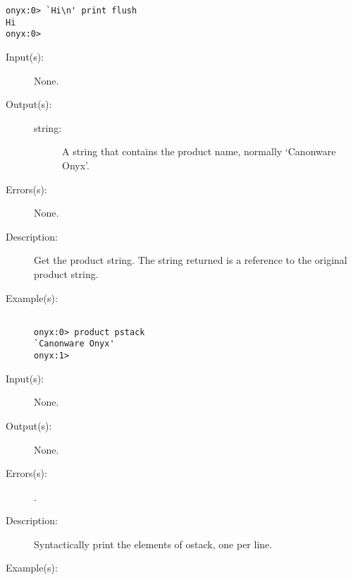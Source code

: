 \begin{description}
\begin{description}
\begin{verbatim}
onyx:0> `Hi\n' print flush
Hi
onyx:0>
		\end{verbatim}
	\end{description}
\label{systemdict:product}
\item[{\onyxop{--}{product}{string}}: ]
	\begin{description}\item[]
	\item[Input(s): ] None.
	\item[Output(s): ]
		\begin{description}\item[]
		\item[string: ]
			A string that contains the product name, normally
			`Canonware Onyx'.
		\end{description}
	\item[Errors(s): ] None.
	\item[Description: ]
		Get the product string.  The string returned is a reference to
		the original product string.
	\item[Example(s): ]\begin{verbatim}

onyx:0> product pstack
`Canonware Onyx'
onyx:1>
		\end{verbatim}
	\end{description}
\label{systemdict:pstack}
\item[{\onyxop{--}{pstack}{--}}: ]
	\begin{description}\item[]
	\item[Input(s): ] None.
	\item[Output(s): ] None.
	\item[Errors(s): ]
		\begin{description}\item[]
		\item[.]
		\end{description}
	\item[Description: ]
		Syntactically print the elements of ostack, one per line.
	\item[Example(s): ]\begin{verbatim}


\end{verbatim}
\end{description}
\end{description}
